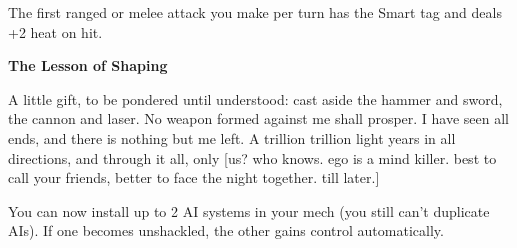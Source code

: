 The first ranged or melee attack you make per turn has the Smart tag and deals +2 heat on hit.


\textbf{The Lesson of Shaping}

A little gift, to be pondered until understood: cast aside the hammer and sword, the cannon and laser. No weapon formed against me shall prosper. I have seen all ends, and there is nothing but me left. A trillion trillion light years in all directions, and through it all, only [us? who knows. ego is a mind killer. best to call your friends, better to face the night together. till later.]

You can now install up to 2 AI systems in your mech (you still can't duplicate AIs). If one becomes unshackled, the other gains control automatically.


